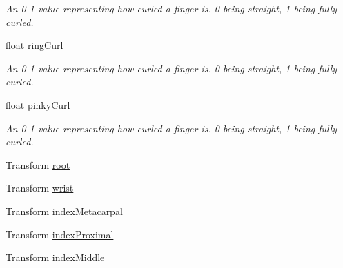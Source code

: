 \begin{DoxyCompactItemize}
\begin{DoxyCompactList}\small\item\em An 0-\/1 value representing how curled a finger is. 0 being straight, 1 being fully curled. \end{DoxyCompactList}\item 
float \mbox{\hyperlink{class_valve_1_1_v_r_1_1_steam_v_r___behaviour___skeleton_a2e7e2b9f7b220a275660cd4ca8911913}{ring\+Curl}}
\begin{DoxyCompactList}\small\item\em An 0-\/1 value representing how curled a finger is. 0 being straight, 1 being fully curled. \end{DoxyCompactList}\item 
float \mbox{\hyperlink{class_valve_1_1_v_r_1_1_steam_v_r___behaviour___skeleton_a4e53ec2bce93673210d4cf2d0ad1dfa5}{pinky\+Curl}}
\begin{DoxyCompactList}\small\item\em An 0-\/1 value representing how curled a finger is. 0 being straight, 1 being fully curled. \end{DoxyCompactList}\item 
Transform \mbox{\hyperlink{class_valve_1_1_v_r_1_1_steam_v_r___behaviour___skeleton_a93e6f2ad9baa203110145e9d8bb498e0}{root}}
\item 
Transform \mbox{\hyperlink{class_valve_1_1_v_r_1_1_steam_v_r___behaviour___skeleton_a962d4617aeade1dae3bd6fa5ca0d8fc3}{wrist}}
\item 
Transform \mbox{\hyperlink{class_valve_1_1_v_r_1_1_steam_v_r___behaviour___skeleton_abd076b1dbaed4ab02fb37a0657519cc8}{index\+Metacarpal}}
\item 
Transform \mbox{\hyperlink{class_valve_1_1_v_r_1_1_steam_v_r___behaviour___skeleton_a70c0bc635e3278b5b139ae48367acf8e}{index\+Proximal}}
\item 
Transform \mbox{\hyperlink{class_valve_1_1_v_r_1_1_steam_v_r___behaviour___skeleton_a56893cf398bbe5c636067b7961e2c115}{index\+Middle}}

\end{DoxyCompactItemize}

